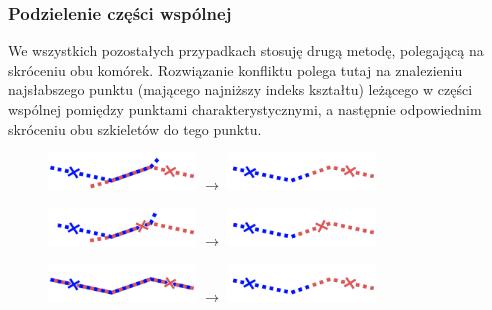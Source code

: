 \documentclass[declaration,shortabstract,mgr]{iithesis}
\begin{document}
\subsubsection{Podzielenie części wspólnej}

We wszystkich pozostałych przypadkach stosuję drugą metodę, polegającą na skróceniu obu komórek.
Rozwiązanie konfliktu polega tutaj na znalezieniu najsłabszego punktu (mającego najniższy indeks kształtu) leżącego w części wspólnej pomiędzy punktami charakterystycznymi, a następnie odpowiednim skróceniu obu szkieletów do tego punktu.

\begin{figure}[H]
  \centering
  \includegraphics[valign=m,width=0.35\textwidth]{images/overlap-out-out-split.png}
  $\rightarrow$
  \includegraphics[valign=m,width=0.35\textwidth]{images/overlap-out-out-split-solved.png}
\end{figure}

\begin{figure}[H]
  \centering
  \includegraphics[valign=m,width=0.35\textwidth]{images/overlap-out-in-split.png}
  $\rightarrow$
  \includegraphics[valign=m,width=0.35\textwidth]{images/overlap-out-in-split-solved.png}
\end{figure}

\begin{figure}[H]
  \centering
  \includegraphics[valign=m,width=0.35\textwidth]{images/overlap-in-in-split.png}
  $\rightarrow$
  \includegraphics[valign=m,width=0.35\textwidth]{images/overlap-in-in-split-solved.png}
\end{figure}
\end{document}
